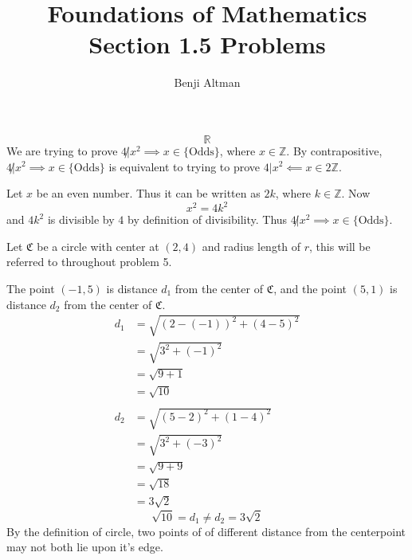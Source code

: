 \documentclass{article}
\title{Foundations of Mathematics\\Section 1.5 Problems}
\author{Benji Altman}
\begin{document}
\maketitle
$$
\mathbb{R}
$$
We are trying to prove $4\not|x^2\implies x\in\{\text{Odds}\}$, where $x\in\mathbb{Z}$. By contrapositive, $4\not|x^2\implies x\in\{\text{Odds}\}$ is equivalent to trying to prove $4|x^2\impliedby x\in2\mathbb Z$.

Let $x$ be an even number. Thus it can be written as $2k$, where $k\in\mathbb Z$. Now
\[x^2=4k^2\]
and $4k^2$ is divisible by $4$ by definition of divisibility. Thus $4\not|x^2\implies x\in\{\text{Odds}\}$.
\vspace{2\baselineskip}

Let $\mathfrak C$ be a circle with center at $(2,4)$ and radius length of $r$, this will be referred to throughout problem 5.
\medskip

The point $(-1,5)$ is distance $d_1$ from the center of $\mathfrak C$, and the point $(5,1)$ is distance $d_2$ from the center of $\mathfrak C$.
\begin{align*}
d_1
&= \sqrt{(2-(-1))^2+(4-5)^2} \\
&= \sqrt{3^2+(-1)^2} \\
&= \sqrt{9+1} \\
&= \sqrt{10}
\\ \\
d_2
&= \sqrt{(5-2)^2+(1-4)^2} \\
&= \sqrt{3^2+(-3)^2} \\
&= \sqrt{9+9} \\
&= \sqrt{18} \\
&= 3\sqrt{2}
\end{align*}
\begin{equation*}
\sqrt{10} = d_1 \not= d_2 = 3\sqrt2
\end{equation*}
By the definition of circle, two points of of different distance from the centerpoint may not both lie upon it's edge.
\bigskip
\end{document}
